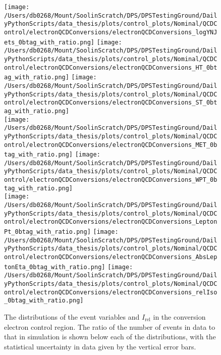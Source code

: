 \begin{figure}[hp!]
	\centering
	\texttt{[image: /Users/db0268/Mount/SoolinScratch/DPS/DPSTestingGround/DailyPythonScripts/data\_thesis/plots/control\_plots/Nominal/QCDControl/electronQCDConversions/electronQCDConversions\_logYNJets\_0btag\_with\_ratio.png]}
	\texttt{[image: /Users/db0268/Mount/SoolinScratch/DPS/DPSTestingGround/DailyPythonScripts/data\_thesis/plots/control\_plots/Nominal/QCDControl/electronQCDConversions/electronQCDConversions\_HT\_0btag\_with\_ratio.png]}
	\texttt{[image: /Users/db0268/Mount/SoolinScratch/DPS/DPSTestingGround/DailyPythonScripts/data\_thesis/plots/control\_plots/Nominal/QCDControl/electronQCDConversions/electronQCDConversions\_ST\_0btag\_with\_ratio.png]} \\
	\texttt{[image: /Users/db0268/Mount/SoolinScratch/DPS/DPSTestingGround/DailyPythonScripts/data\_thesis/plots/control\_plots/Nominal/QCDControl/electronQCDConversions/electronQCDConversions\_MET\_0btag\_with\_ratio.png]}
	\texttt{[image: /Users/db0268/Mount/SoolinScratch/DPS/DPSTestingGround/DailyPythonScripts/data\_thesis/plots/control\_plots/Nominal/QCDControl/electronQCDConversions/electronQCDConversions\_WPT\_0btag\_with\_ratio.png]} \\
	\texttt{[image: /Users/db0268/Mount/SoolinScratch/DPS/DPSTestingGround/DailyPythonScripts/data\_thesis/plots/control\_plots/Nominal/QCDControl/electronQCDConversions/electronQCDConversions\_LeptonPt\_0btag\_with\_ratio.png]} 
	\texttt{[image: /Users/db0268/Mount/SoolinScratch/DPS/DPSTestingGround/DailyPythonScripts/data\_thesis/plots/control\_plots/Nominal/QCDControl/electronQCDConversions/electronQCDConversions\_AbsLeptonEta\_0btag\_with\_ratio.png]}
	\texttt{[image: /Users/db0268/Mount/SoolinScratch/DPS/DPSTestingGround/DailyPythonScripts/data\_thesis/plots/control\_plots/Nominal/QCDControl/electronQCDConversions/electronQCDConversions\_relIso\_0btag\_with\_ratio.png]}
	\caption[The distributions of the event variables and $I_{\mathrm{rel}}$ in the conversion electron control region. The ratio of the number of events in data to that in simulation is shown below each of the distributions, with the statistical uncertainty in data given by the vertical error bars.]{The distributions of the event variables and $I_{\mathrm{rel}}$ in the conversion electron control region. The ratio of the number of events in data to that in simulation is shown below each of the distributions, with the statistical uncertainty in data given by the vertical error bars.}
	\label{fig:QCDeConv}
\end{figure}
